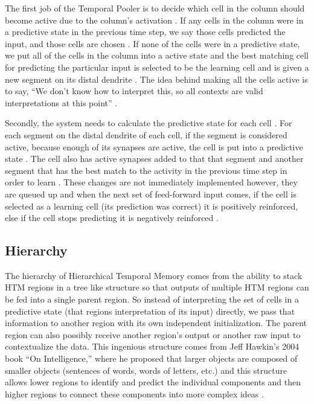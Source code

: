\documentclass[fleqn,notitlepage,minimal]{article}
\begin{document}
	The first job of the Temporal Pooler is to decide which cell in the column should become active due to the column's activation \cite{Principles}. If any cells in the column were in a predictive state in the previous time step, we say those cells predicted the input, and those cells are chosen \cite{Whitepaper}. If none of the cells were in a predictive state, we put all of the cells in the column into a active state and the best matching cell for predicting the particular input is selected to be the learning cell and is given a new segment on its distal dendrite \cite{Whitepaper}. The idea behind making all the cells active is to say, ``We don't know how to interpret this, so all contexts are valid interpretations at this point'' \cite{Principles}.
	
	Secondly, the system needs to calculate the predictive state for each cell \cite{Whitepaper}. For each segment on the distal dendrite of each cell, if the segment is considered active, because enough of its synapses are active, the cell is put into a predictive state \cite{Principles}. The cell also has active synapses added to that that segment and another segment that has the best match to the activity in the previous time step in order to learn \cite{Whitepaper}. These changes are not immediately implemented however, they are queued up and when the next set of feed-forward input comes, if the cell is selected as a learning cell (its prediction was correct) it is positively reinforced, else if the cell stops predicting it is negatively reinforced \cite{Whitepaper}.
	
	\subsection{Hierarchy}
	
	The hierarchy of Hierarchical Temporal Memory comes from the ability to stack HTM regions in a tree like structure so that outputs of multiple HTM regions can be fed into a single parent region. So instead of interpreting the set of cells in a predictive state (that regions interpretation of its input) directly, we pass that information to another region with its own independent initialization. The parent region can also possibly receive another region's output or another raw input to contextualize the data. This ingenious structure comes from Jeff Hawkin's 2004 book ``On Intelligence,'' where he proposed that larger objects are composed of smaller objects (sentences of words, words of letters, etc.) and this structure allows lower regions to identify and predict the individual components and then higher regions to connect these components into more complex ideas \cite{Evaluation}.
	
\end{document}
